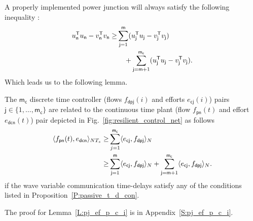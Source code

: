A properly implemented power junction will always satisfy the
following inequality \cite{kottenstette08:_contr_of_multip_networ_passiv}:
\begin{equation}
\label{E:passive_power_junction}
\begin{split}
   u_{\mathsf{n}}^{\mathsf{T}} u_{\mathsf{n}} - v_{\mathsf{n}}^{\mathsf{T}}
   v_{\mathsf{n}} \geq & \sum_{\mathsf{j}=1}^{\mathsf{m}}
   (u_{\mathsf{j}}^{\mathsf{T}}  u_{\mathsf{j}} - v_{\mathsf{j}}^{\mathsf{T}}
   v_{\mathsf{j}}) \\
   & \quad + \sum_{\mathsf{j}=\mathsf{m} +1}^{\mathsf{m_c}}
   (u_{\mathsf{j}}^{\mathsf{T}}  u_{\mathsf{j}} - v_{\mathsf{j}}^{\mathsf{T}}
   v_{\mathsf{j}}).
\end{split}
\end{equation}
Which leads us to the following lemma.
\begin{lemma}
\label{L:pj_ef_p_c_i}
The $\mathsf{m_c}$ discrete time controller (flows $f_{\mathsf{dpj}}(i)$ and efforts $e_{\mathsf{cj}}(i)$) pairs $\mathsf{j} \in \{1,\dots,\mathsf{m_c}\}$ are related to the continuous time plant (flow $f_{\mathsf{pn}}(t)$ and effort $e_{\mathsf{dcn}}(t)$) pair depicted in Fig.~\ref{fig:resilient_control_net} as follows
\begin{align}
\langle f_{\mathsf{pn}}(t),e_{\mathsf{dcn}} \rangle_{NT_s} \geq &
\sum_{j=1}^{\mathsf{m_c}}
\langle e_{\mathsf{cj}},f_{\mathsf{dpj}} \rangle_N \nonumber\\
\label{E:pj_ef_p_c_i}
\geq & \sum_{\mathsf{j}=1}^{\mathsf{m}}
\langle e_{\mathsf{cj}},f_{\mathsf{dpj}} \rangle_N + \sum_{\mathsf{j}=\mathsf{m}+1}^{\mathsf{m_c}}
\langle e_{\mathsf{cj}},f_{\mathsf{dpj}} \rangle_N.
\end{align}
if the wave variable communication time-delays satisfy
any of the conditions listed in Proposition~\ref{P:passive_t_d_con}.
\end{lemma}
The proof for Lemma~\ref{L:pj_ef_p_c_i} is in Appendix~\ref{S:pj_ef_p_c_i}.
